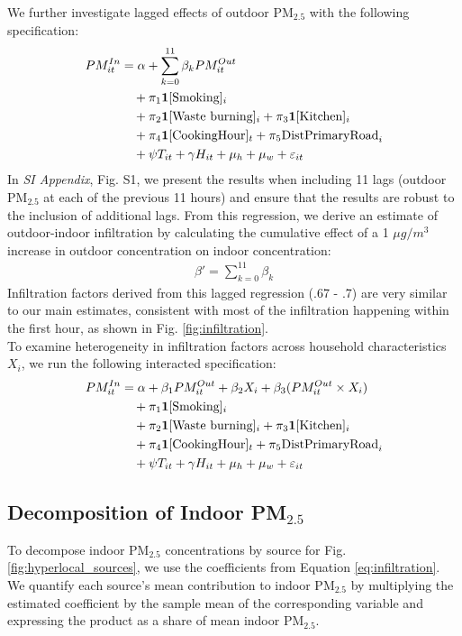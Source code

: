 \documentclass[9pt,twocolumn,twoside]{pnas-new}
\begin{document}
We further investigate lagged effects of outdoor PM$_{2.5}$ with the following specification:
\begin{align}
     PM^{In}_{it} &= \alpha + \sum_{k = 0}^{11}\beta_k PM^{Out}_{it} \\
     &\quad+ \pi_1 \mathbf{1}[\text{Smoking}]_i  \notag \\ &\quad+ \pi_2 \mathbf{1}[\text{Waste burning}]_i + \pi_3 \mathbf{1}[\text{Kitchen}]_i \notag \\ &\quad + \pi_4 \mathbf{1}[\text{CookingHour}]_t + \pi_5 \text{DistPrimaryRoad}_i \notag \\ &\quad+ \psi T_{it} + \gamma H_{it} + \mu_h + \mu_w + \varepsilon_{it} \notag
\end{align}
In \textit{SI Appendix}, Fig. S1, we present the results when including 11 lags (outdoor PM$_{2.5}$ at each of the previous 11 hours) and ensure that the results are robust to the inclusion of additional lags. From this regression, we derive an estimate of outdoor-indoor infiltration by calculating the cumulative effect of a 1 $\mu g/m^3$ increase in outdoor concentration on indoor concentration:
\begin{align}
    \beta' = \sum_{k=0}^11 \beta_k
\end{align}
Infiltration factors derived from this lagged regression (.67 - .7) are very similar to our main estimates, consistent with most of the infiltration happening within the first hour, as shown in Fig. \ref{fig:infiltration}.
\\

To examine heterogeneity in infiltration factors across household characteristics $X_i$, we run the following interacted specification:
\begin{align}
    PM^{In}_{it} &= \alpha + \beta_1 PM^{Out}_{it} + \beta_2 X_i + \beta_3(PM^{Out}_{it} \times X_i) \\ 
    &\quad + \pi_1 \mathbf{1}[\text{Smoking}]_i  \notag \\
    &\quad + \pi_2 \mathbf{1}[\text{Waste burning}]_i \notag + \pi_3 \mathbf{1}[\text{Kitchen}]_i \\ &\quad + \pi_4 \mathbf{1}[\text{CookingHour}]_t \notag + \pi_5 \text{DistPrimaryRoad}_i \\ &\quad + \psi T_{it} + \gamma H_{it} + \mu_h + \mu_w + \varepsilon_{it} \notag
\end{align}

\subsection{Decomposition of Indoor PM$_{2.5}$}
To decompose indoor PM$_{2.5}$ concentrations by source for Fig. \ref{fig:hyperlocal_sources}, we use the coefficients from Equation \ref{eq:infiltration}. We quantify each source's mean contribution to indoor PM$_{2.5}$ by multiplying the estimated coefficient by the sample mean of the corresponding variable and expressing the product as a share of mean indoor PM$_{2.5}$. 
\end{document}
